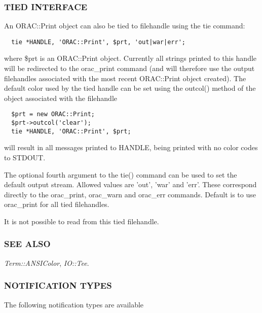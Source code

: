 \subsubsection*{TIED INTERFACE\label{ORAC::Print_TIED_INTERFACE}}


An ORAC::Print object can also be tied to filehandle using the
tie command:

\begin{verbatim}
  tie *HANDLE, 'ORAC::Print', $prt, 'out|war|err';
\end{verbatim}


where \$prt is an ORAC::Print object. Currently all strings printed
to this handle will be redirected to the orac\_print command
(and will therefore use the output filehandles associated with the
most recent ORAC::Print object created). The default color used
by the tied handle can be set using the outcol() method of the
object associated with the filehandle

\begin{verbatim}
  $prt = new ORAC::Print;
  $prt->outcol('clear');
  tie *HANDLE, 'ORAC::Print', $prt;
\end{verbatim}


will result in all messages printed to HANDLE, being printed
with no color codes to STDOUT.



The optional fourth argument to the tie() command can be used
to set the default output stream. Allowed values are 'out',
'war' and 'err'. These correspond directly to the orac\_print,
orac\_warn and orac\_err commands. Default is to use orac\_print
for all tied filehandles.



It is not possible to read from this tied filehandle.

\subsubsection*{SEE ALSO\label{ORAC::Print_SEE_ALSO}}


\emph{Term::ANSIColor}, \emph{IO::Tee}.

\subsubsection*{NOTIFICATION TYPES\label{ORAC::Print_NOTIFICATION_TYPES}}


The following notification types are available

